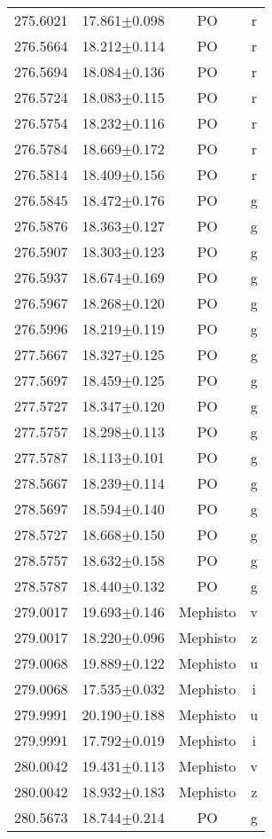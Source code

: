 \begin{table}
\begin{tabular}{cccc}
275.6021 & 17.861$\pm$0.098 & PO & r \\
276.5664 & 18.212$\pm$0.114 & PO & r \\
276.5694 & 18.084$\pm$0.136 & PO & r \\
276.5724 & 18.083$\pm$0.115 & PO & r \\
276.5754 & 18.232$\pm$0.116 & PO & r \\
276.5784 & 18.669$\pm$0.172 & PO & r \\
276.5814 & 18.409$\pm$0.156 & PO & r \\
276.5845 & 18.472$\pm$0.176 & PO & g \\
276.5876 & 18.363$\pm$0.127 & PO & g \\
276.5907 & 18.303$\pm$0.123 & PO & g \\
276.5937 & 18.674$\pm$0.169 & PO & g \\
276.5967 & 18.268$\pm$0.120 & PO & g \\
276.5996 & 18.219$\pm$0.119 & PO & g \\
277.5667 & 18.327$\pm$0.125 & PO & g \\
277.5697 & 18.459$\pm$0.125 & PO & g \\
277.5727 & 18.347$\pm$0.120 & PO & g \\
277.5757 & 18.298$\pm$0.113 & PO & g \\
277.5787 & 18.113$\pm$0.101 & PO & g \\
278.5667 & 18.239$\pm$0.114 & PO & g \\
278.5697 & 18.594$\pm$0.140 & PO & g \\
278.5727 & 18.668$\pm$0.150 & PO & g \\
278.5757 & 18.632$\pm$0.158 & PO & g \\
278.5787 & 18.440$\pm$0.132 & PO & g \\
279.0017 & 19.693$\pm$0.146 & Mephisto & v \\
279.0017 & 18.220$\pm$0.096 & Mephisto & z \\
279.0068 & 19.889$\pm$0.122 & Mephisto & u \\
279.0068 & 17.535$\pm$0.032 & Mephisto & i \\
279.9991 & 20.190$\pm$0.188 & Mephisto & u \\
279.9991 & 17.792$\pm$0.019 & Mephisto & i \\
280.0042 & 19.431$\pm$0.113 & Mephisto & v \\
280.0042 & 18.932$\pm$0.183 & Mephisto & z \\
280.5673 & 18.744$\pm$0.214 & PO & g \\

\end{tabular}
\end{table}
